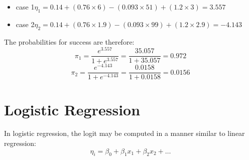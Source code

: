 \documentclass[a4paper,12pt]{article}
\begin{document}
\begin{itemize}
	\item case 1$ \eta_1 = 0.14 + (0.76 \times 6)	- (0.093\times 51) + (1.2\times 3) = 3.557$
	\item case 2$ \eta_2 = 0.14 + (0.76 \times 1.9)	- (0.093\times 99) + (1.2\times 2.9) = -4.143$
\end{itemize}

The probabilities for success are therefore:
\[ \pi_1  =  \frac{e^{3.557}}{1 + e^{3.557}} = \frac{35.057}{1 + 35.057} = 0.972 \]
\[ \pi_2  =  \frac{e^{-4.143}}{1 + e^{-4.143}} = \frac{0.0158}{1 + 0.0158} = 0.0156 \]


\section{Logistic Regression}
In logistic regression, the logit may be computed in a manner similar to linear regression:
\[ \eta_i = \beta_0 + \beta_1x_1 + \beta_2x_2 + \ldots  \]

\end{document}
